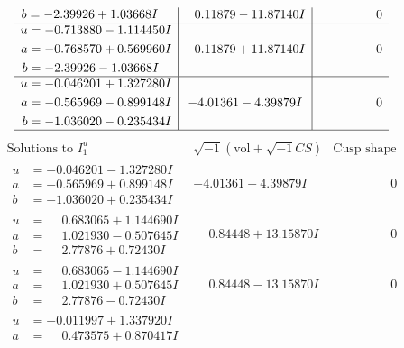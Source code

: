 \documentclass[1p]{elsarticle_modified}
\theoremstyle{definition}
\newcommand{\I}{\sqrt{-1}}
\begin{document}
$$\begin{array}{c|c|c}
\begin{aligned}
b &= -2.39926 + 1.03668 I\end{aligned}
 & \phantom{-}0.11879 - 11.87140 I & \phantom{-0.000000 } 0 \\ \hline\begin{aligned}
u &= -0.713880 - 1.114450 I \\
a &= -0.768570 + 0.569960 I \\
b &= -2.39926 - 1.03668 I\end{aligned}
 & \phantom{-}0.11879 + 11.87140 I & \phantom{-0.000000 } 0 \\ \hline\begin{aligned}
u &= -0.046201 + 1.327280 I \\
a &= -0.565969 - 0.899148 I \\
b &= -1.036020 - 0.235434 I\end{aligned}
 & -4.01361 - 4.39879 I & \phantom{-0.000000 } 0\\
 \hline 
 \end{array}$$\newpage$$\begin{array}{c|c|c}  
\text{Solutions to }I^u_{1}& \I (\text{vol} + \sqrt{-1}CS) & \text{Cusp shape}\\
 \hline 
\begin{aligned}
u &= -0.046201 - 1.327280 I \\
a &= -0.565969 + 0.899148 I \\
b &= -1.036020 + 0.235434 I\end{aligned}
 & -4.01361 + 4.39879 I & \phantom{-0.000000 } 0 \\ \hline\begin{aligned}
u &= \phantom{-}0.683065 + 1.144690 I \\
a &= \phantom{-}1.021930 - 0.507645 I \\
b &= \phantom{-}2.77876 + 0.72430 I\end{aligned}
 & \phantom{-}0.84448 + 13.15870 I & \phantom{-0.000000 } 0 \\ \hline\begin{aligned}
u &= \phantom{-}0.683065 - 1.144690 I \\
a &= \phantom{-}1.021930 + 0.507645 I \\
b &= \phantom{-}2.77876 - 0.72430 I\end{aligned}
 & \phantom{-}0.84448 - 13.15870 I & \phantom{-0.000000 } 0 \\ \hline\begin{aligned}
u &= -0.011997 + 1.337920 I \\
a &= \phantom{-}0.473575 + 0.870417 I \\

\end{aligned}
\end{array}$$
\end{document}

